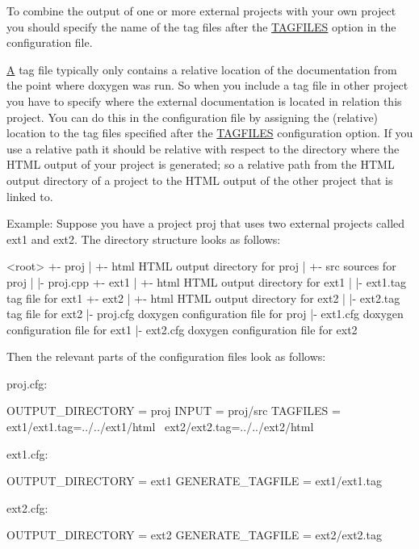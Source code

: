To combine the output of one or more external projects with your own project you should specify the name of the tag files after the \mbox{\hyperlink{config_cfg_tagfiles}{T\+A\+G\+F\+I\+L\+ES}} option in the configuration file.

\mbox{\hyperlink{class_a}{A}} tag file typically only contains a relative location of the documentation from the point where doxygen was run. So when you include a tag file in other project you have to specify where the external documentation is located in relation this project. You can do this in the configuration file by assigning the (relative) location to the tag files specified after the \mbox{\hyperlink{config_cfg_tagfiles}{T\+A\+G\+F\+I\+L\+ES}} configuration option. If you use a relative path it should be relative with respect to the directory where the H\+T\+ML output of your project is generated; so a relative path from the H\+T\+ML output directory of a project to the H\+T\+ML output of the other project that is linked to.

\begin{DoxyParagraph}{Example\+: }
Suppose you have a project {\ttfamily proj} that uses two external projects called {\ttfamily ext1} and {\ttfamily ext2}. The directory structure looks as follows\+:
\end{DoxyParagraph}
\begin{DoxyParagraph}{}
\begin{DoxyVerb}<root>
  +- proj
  |   +- html               HTML output directory for proj
  |   +- src                sources for proj
  |   |- proj.cpp
  +- ext1
  |   +- html               HTML output directory for ext1
  |   |- ext1.tag           tag file for ext1
  +- ext2
  |   +- html               HTML output directory for ext2
  |   |- ext2.tag           tag file for ext2
  |- proj.cfg               doxygen configuration file for proj
  |- ext1.cfg               doxygen configuration file for ext1
  |- ext2.cfg               doxygen configuration file for ext2
\end{DoxyVerb}

\end{DoxyParagraph}
\begin{DoxyParagraph}{}
Then the relevant parts of the configuration files look as follows\+: 
\end{DoxyParagraph}
\begin{DoxyParagraph}{}
proj.\+cfg\+: \begin{DoxyVerb}OUTPUT_DIRECTORY  = proj
INPUT             = proj/src
TAGFILES          = ext1/ext1.tag=../../ext1/html \
                    ext2/ext2.tag=../../ext2/html 
\end{DoxyVerb}
 ext1.\+cfg\+: \begin{DoxyVerb}OUTPUT_DIRECTORY  = ext1
GENERATE_TAGFILE  = ext1/ext1.tag 
\end{DoxyVerb}
 ext2.\+cfg\+: \begin{DoxyVerb}OUTPUT_DIRECTORY  = ext2
GENERATE_TAGFILE  = ext2/ext2.tag
\end{DoxyVerb}

\end{DoxyParagraph}
 